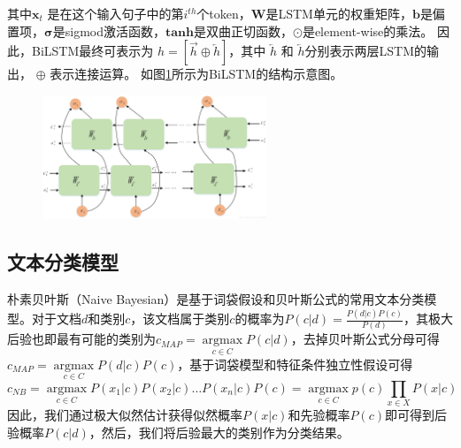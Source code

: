 其中$\mathbf{x}_{t}$ 是在这个输入句子中的第$i^{th}$个token，$\mathbf{W}$是LSTM单元的权重矩阵，$\mathbf{b}$是偏置项，$\mathbf{\sigma}$是sigmod激活函数，$\mathbf{tanh}$是双曲正切函数，$\odot$是element-wise的乘法。
因此，BiLSTM最终可表示为 $h=[\overrightarrow{h}\oplus \overleftarrow{h}]$，其中 $ \overleftarrow{h}$ 和  $ \overleftarrow{h}$分别表示两层LSTM的输出， $\oplus$ 表示连接运算。
如图\ref{fig:bilstm}所示为BiLSTM的结构示意图。
\begin{figure}[htb]
    \centering
    \includegraphics[width=0.6\textwidth]{Img/bilstm.jpg}
    \label{fig:bilstm}
\end{figure}

\subsection{文本分类模型}
朴素贝叶斯（Naive Bayesian）\cite{mccallum1998comparison}是基于词袋假设和贝叶斯公式的常用文本分类模型。对于文档$d$和类别$c$，该文档属于类别$c$的概率为$P(c|d)=\frac{P(d|c)P(c)}{P(d)}$，其极大后验也即最有可能的类别为$c_{MAP}=\mathop{\arg\max}\limits_{c \in C}P(c|d)$，去掉贝叶斯公式分母可得$c_{MAP}=\mathop{\arg\max}\limits_{c \in C}P(d|c)P(c)$，基于词袋模型和特征条件独立性假设可得
$$c_{NB}=\mathop{\arg\max}\limits_{c \in C}P(x_1|c)P(x_2|c)\dots P(x_n|c)P(c)=\mathop{\arg\max}\limits_{c \in C}p(c)\prod\limits_{x \in X}P(x|c)$$
因此，我们通过极大似然估计获得似然概率$P(x|c)$和先验概率$P(c)$即可得到后验概率$P(c|d)$，然后，我们将后验最大的类别作为分类结果。


